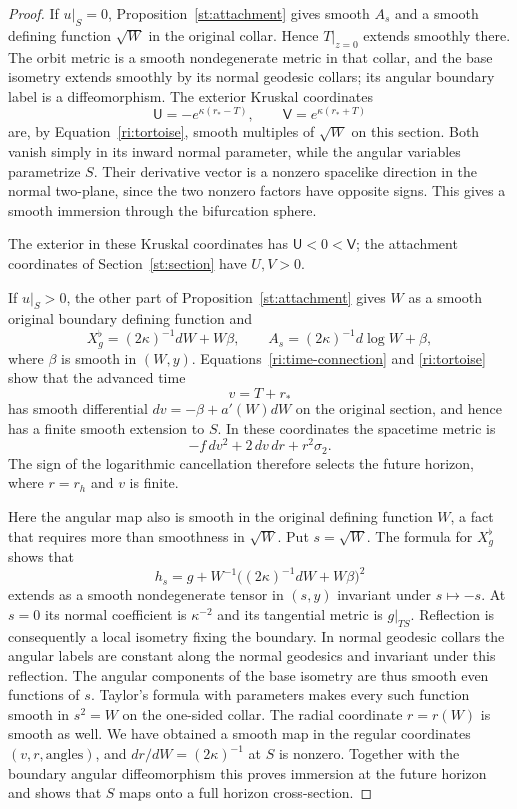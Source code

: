 \begin{proof}
If $u|_S=0$, Proposition~\ref{st:attachment} gives smooth
$A_s$ and a smooth defining function $\sqrt W$ in the original
collar.  Hence $T|_{z=0}$ extends smoothly there.  The orbit
metric is a smooth nondegenerate metric in that collar, and the
base isometry extends smoothly by its normal geodesic collars;
its angular boundary label is a diffeomorphism.  The exterior
Kruskal coordinates
\[
 \mathsf U=-e^{\kappa(r_*-T)},\qquad
 \mathsf V=e^{\kappa(r_*+T)}
\]
are, by Equation~\eqref{ri:tortoise}, smooth multiples of
$\sqrt W$ on this section.  Both vanish simply in its inward
normal parameter, while the angular variables parametrize $S$.
Their derivative vector is a nonzero spacelike direction in
the normal two-plane, since the two nonzero factors have
opposite signs.  This gives a smooth immersion through the
bifurcation sphere.

The exterior in these Kruskal coordinates has $\mathsf U<0<\mathsf V$;
the attachment coordinates of Section~\ref{st:section} have $U,V>0$.

If $u|_S>0$, the other part of Proposition~\ref{st:attachment}
gives $W$ as a smooth original boundary defining function and
\[
 X_g^\flat=(2\kappa)^{-1}dW+W\beta,
 \qquad A_s=(2\kappa)^{-1}d\log W+\beta,
\]
where $\beta$ is smooth in $(W,y)$.  Equations~\eqref{ri:time-connection}
and \eqref{ri:tortoise} show that the advanced time
\[
 v=T+r_*
\]
has smooth differential $dv=-\beta+a'(W)dW$ on the original
section, and hence has a finite smooth extension to $S$.
In these coordinates the spacetime metric is
\[
 -f\,dv^2+2\,dv\,dr+r^2\sigma_2.
\]
The sign of the logarithmic cancellation therefore selects the
future horizon, where $r=r_h$ and $v$ is finite.

Here the angular map also is smooth in the original defining
function $W$, a fact that requires more than smoothness in
$\sqrt W$.  Put $s=\sqrt W$.  The formula for $X_g^\flat$ shows
that
\[
 h_s=g+W^{-1}\bigl((2\kappa)^{-1}dW+W\beta\bigr)^2
\]
extends as a smooth nondegenerate tensor in $(s,y)$ invariant
under $s\mapsto-s$.  At $s=0$ its normal coefficient is
$\kappa^{-2}$ and its tangential metric is $g|_{TS}$.
Reflection is consequently a local isometry fixing the
boundary.  In normal geodesic collars the angular labels are
constant along the normal geodesics and invariant under this
reflection.  The angular components of the base isometry are
thus smooth even functions of $s$.  Taylor's formula with
parameters makes every such function smooth in $s^2=W$ on the
one-sided collar.  The radial coordinate $r=r(W)$ is smooth as
well.  We have obtained a smooth map in the regular coordinates
$(v,r,\text{angles})$, and $dr/dW=(2\kappa)^{-1}$ at $S$ is
nonzero.  Together with the boundary angular diffeomorphism
this proves immersion at the future horizon and shows that
$S$ maps onto a full horizon cross-section.


\end{proof}
